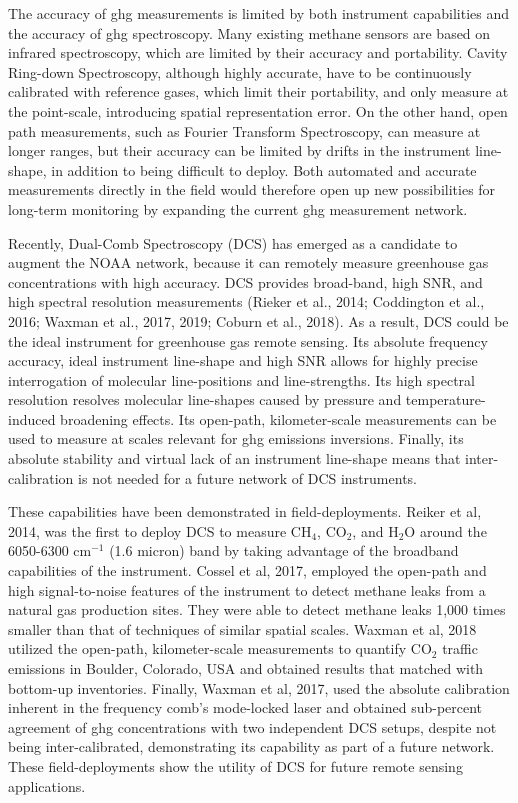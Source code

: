 \documentclass[amt, manuscript]{copernicus}
\begin{document}
The accuracy of ghg measurements is limited by both instrument capabilities and the accuracy of ghg spectroscopy. Many existing methane sensors are based on infrared spectroscopy, which are limited by their accuracy and portability. Cavity Ring-down Spectroscopy, although highly accurate, have to be continuously calibrated with reference gases, which limit their portability, and only measure at the point-scale, introducing spatial representation error. On the other hand, open path measurements, such as Fourier Transform Spectroscopy, can measure at longer ranges, but their accuracy can be limited by drifts in the instrument line-shape, in addition to being difficult to deploy. Both automated and accurate measurements directly in the field would therefore open up new possibilities for long-term monitoring by expanding the current ghg measurement network.

Recently, Dual-Comb Spectroscopy (DCS) has emerged as a candidate to augment the NOAA network, because it can remotely measure greenhouse gas concentrations with high accuracy. DCS provides broad-band, high SNR, and high spectral resolution measurements (Rieker et al., 2014; Coddington et al., 2016; Waxman et al., 2017, 2019; Coburn et al., 2018). As a result, DCS could be the ideal instrument for greenhouse gas remote sensing. Its absolute frequency accuracy, ideal instrument line-shape and high SNR allows for highly precise interrogation of molecular line-positions and line-strengths. Its high spectral resolution resolves molecular line-shapes caused by pressure and temperature-induced broadening effects. Its open-path, kilometer-scale measurements can be used to measure at scales relevant for ghg emissions inversions. Finally, its absolute stability and virtual lack of an instrument line-shape means that inter-calibration is not needed for a future network of DCS instruments. 

These capabilities have been demonstrated in field-deployments. Reiker et al, 2014, was the first to deploy DCS to measure CH$_4$, CO$_2$, and H$_2$O around the 6050-6300 cm$^{-1}$ (1.6 micron) band by taking advantage of the broadband capabilities of the instrument. Cossel et al, 2017, employed the open-path and high signal-to-noise features of the instrument to detect methane leaks from a natural gas production sites. They were able to detect methane leaks 1,000 times smaller than that of techniques of similar spatial scales. Waxman et al, 2018 utilized the open-path, kilometer-scale measurements to quantify CO$_2$ traffic emissions in Boulder, Colorado, USA and obtained results that matched with bottom-up inventories. Finally, Waxman et al, 2017, used the absolute calibration inherent in the frequency comb’s mode-locked laser and obtained sub-percent agreement of ghg concentrations with two independent DCS setups, despite not being inter-calibrated, demonstrating its capability as part of a future network. These field-deployments show the utility of DCS for future remote sensing applications.
\end{document}
